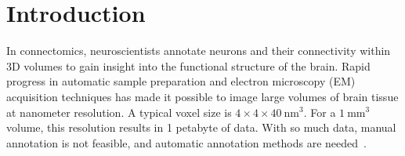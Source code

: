 \section{Introduction}


In connectomics, neuroscientists annotate neurons and their connectivity within 3D volumes to gain insight into the functional structure of the brain. Rapid progress in automatic sample preparation and electron microscopy (EM) acquisition techniques has made it possible to image large volumes of brain tissue at nanometer resolution. A typical voxel size is $4\times4\times40~\text{nm}^3$. For a $1~\text{mm}^3$ volume, this resolution results in 1 petabyte of data. With so much data, manual annotation is not feasible, and automatic annotation methods are needed~\cite{jain2010,Liu2014,GALA2014,kaynig2015large}.

